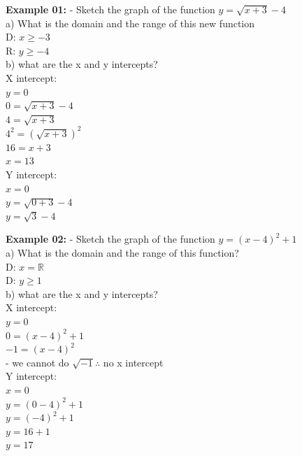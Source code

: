 \documentclass[10pt]{article}
\begin{document}
\textbf{Example 01:}
- Sketch the graph of the function \(y=\sqrt{x+3}-4\) \\
a) What is the domain and the range of this new function \\
D: \(x \geq -3\) \\
R: \(y \geq -4\) \\
b) what are the x and y intercepts? \\
X intercept: \\
\hspace*{1em} \(y=0\) \\
\hspace*{1em} \(0 = \sqrt{x+3}-4\) \\
\hspace*{1em} \(4=\sqrt{x+3}\) \\
\hspace*{1em} \(4^2=(\sqrt{x+3})^2\) \\
\hspace*{1em} \(16=x+3\) \\
\hspace*{1em} \(x=13\) \\
Y intercept: \\
\hspace*{1em} \(x=0\) \\
\hspace*{1em} \(y = \sqrt{0+3}-4\) \\
\hspace*{1em} \(y=\sqrt{3}-4\)


\textbf{Example 02:}
- Sketch the graph of the function \(y = (x-4)^2 + 1 \) \\
a) What is the domain and the range of this function? \\
D: \(x = \mathbb{R} \) \\
D: \(y \geq 1 \) \\
b) what are the x and y intercepts? \\
X intercept: \\
\hspace*{1em} \(y=0\) \\
\hspace*{1em} \(0 = (x-4)^2 + 1\) \\
\hspace*{1em} \(-1 = (x-4)^2\) \\
- we cannot do \(\sqrt{-1} \therefore\) no x intercept \\
Y intercept: \\
\hspace*{1em} \(x=0\) \\
\hspace*{1em} \(y = (0-4)^2 + 1\) \\
\hspace*{1em} \(y = (-4)^2 + 1\) \\
\hspace*{1em} \(y = 16 + 1\) \\
\hspace*{1em} \(y = 17\)
\end{document}

